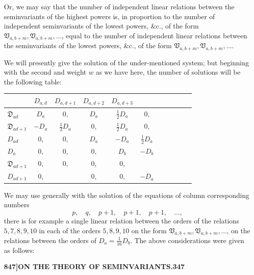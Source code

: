 \documentclass[11pt,a4paper]{book}
\begin{document}
Or, we may say that the number of independent linear relations between the seminvariants of the highest powers is, in proportion to the number of independent seminvariants of the lowest powers, $\&\text{c.}$, of the form $\mathfrak{V}_{a,b+m}, \mathfrak{V}_{a,b+m}, \ldots$, equal to the number of independent linear relations between the seminvariants of the lowest powers, $\&\text{c.}$, of the form $\mathfrak{V}_{a,b+m}, \mathfrak{V}_{a,b+m}, \ldots$.

We will presently give the solution of the under-mentioned system; but beginning with the second and weight $w$ as we have here, the number of solutions will be the following table:

\medskip

\begin{center}
\small
\begin{tabular}{l|cccccccccc}
& $D_{a,d}$ & $D_{a,d+1}$ & $D_{a,d+2}$ & $D_{a,d+3}$ & & & & & & \\
\hline
$\mathfrak{D}_{ad}$ & $D_a$ & $0$, & $D_a$ & $\frac{1}{2}D_a$ & $0$, & & & & & \\
$\mathfrak{D}_{ad+1}$ & $-D_a$ & $\frac{1}{2}D_a$ & $0$, & $\frac{1}{2}D_a$ & $0$, & & & & & \\
$D_{ad}$ & $0$, & $0$, & $D_a$ & $-D_a$ & $\frac{1}{2}D_a$ & & & & & \\
$D_a$ & $0$, & $0$, & $0$, & $D_b$ & $-D_b$ & & & & & \\
$\mathfrak{D}_{ad+1}$ & $0$, & $0$, & $0$, & $0$, & & & & & & \\
$D_{ad+1}$ & $0$, & & $0$, & $0$, & $-D_a$ & & & & & \\
\end{tabular}
\end{center}
\medskip

We may use generally with the solution of the equations of column corresponding numbers
\[
p, \quad q, \quad p + 1, \quad p + 1, \quad p + 1, \quad \ldots,
\]
there is for example a single linear relation between the orders of the relations $5, 7, 8, 9, 10$ in each of the orders $5, 8, 9, 10$ on the form $\mathfrak{V}_{a,b+m}, \mathfrak{V}_{a,b+m}, \ldots$, on the relations between the orders of $D_a = \frac{1}{16}D_b$. The above considerations were given as follows:

\newpage
\setcounter{page}{347}

\noindent\textbf{847]}\hfill\textbf{ON THE THEORY OF SEMINVARIANTS.}\hfill\textbf{347}

\bigskip
\end{document}
